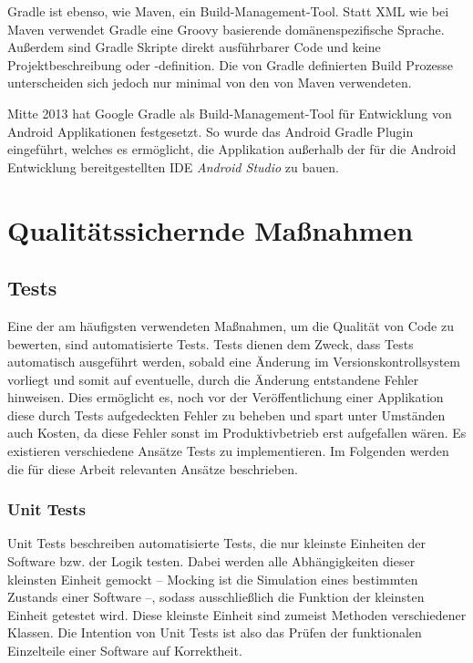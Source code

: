 			Gradle ist ebenso, wie Maven, ein Build-Management-Tool. Statt XML wie bei Maven verwendet Gradle eine Groovy basierende domänenspezifische Sprache. Außerdem sind Gradle Skripte direkt ausführbarer Code und keine Projektbeschreibung oder -definition. Die von Gradle definierten Build Prozesse unterscheiden sich jedoch nur minimal von den von Maven verwendeten. 
			
			Mitte 2013 hat Google Gradle als Build-Management-Tool für Entwicklung von Android Applikationen festgesetzt. So wurde das Android Gradle Plugin eingeführt, welches es ermöglicht, die Applikation außerhalb der für die Android Entwicklung bereitgestellten \acs{IDE} \textit{Android Studio} zu bauen. \cite{Google.2282020}
		
	\section{Qualitätssichernde Maßnahmen} %
	
		\subsection{Tests} %
		\label{qm.tests}
		
			Eine der am häufigsten verwendeten Maßnahmen, um die Qualität von Code zu bewerten, sind automatisierte Tests. Tests dienen dem Zweck, dass Tests automatisch ausgeführt werden, sobald eine Änderung im Versionskontrollsystem vorliegt und somit auf eventuelle, durch die Änderung entstandene Fehler hinweisen. Dies ermöglicht es, noch vor der Veröffentlichung einer Applikation diese durch Tests aufgedeckten Fehler zu beheben und spart unter Umständen auch Kosten, da diese Fehler sonst im Produktivbetrieb erst aufgefallen wären. \cite{Huizinga.2007} Es existieren verschiedene Ansätze Tests zu implementieren. Im Folgenden werden die für diese Arbeit relevanten Ansätze beschrieben. 
			
			\subsubsection{Unit Tests}
			
				Unit Tests beschreiben automatisierte Tests, die nur kleinste Einheiten der Software bzw. der Logik testen. Dabei werden alle Abhängigkeiten dieser kleinsten Einheit gemockt -- Mocking ist die Simulation eines bestimmten Zustands einer Software --, sodass ausschließlich die Funktion der kleinsten Einheit getestet wird. Diese kleinste Einheit sind zumeist Methoden verschiedener Klassen. Die Intention von Unit Tests ist also das Prüfen der funktionalen Einzelteile einer Software auf Korrektheit. 
			
